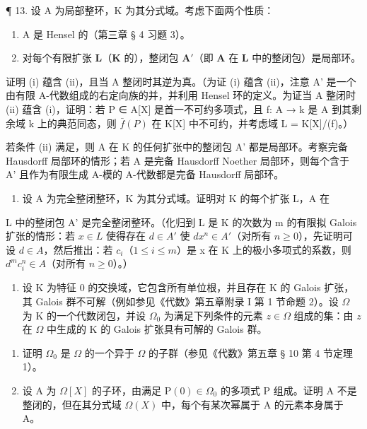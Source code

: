 ¶ 13. 设 A 为局部整环，K 为其分式域。考虑下面两个性质：

\begin{enumerate}
\def\labelenumi{(\roman{enumi})}
\item
  A 是 Hensel 的（第三章 § 4 习题 3）。
\item
  对每个有限扩张 \(\mathbf{L}\)（\(\mathbf{K}\) 的），整闭包 \(\mathbf{A}'\)（即 \(\mathbf{A}\) 在 \(\mathbf{L}\) 中的整闭包）是局部环。
\end{enumerate}

证明 (i) 蕴含 (ii)，且当 A 整闭时其逆为真。（为证 (i) 蕴含 (ii)，注意 A' 是一个由有限 A-代数组成的右定向族的并，并利用 Hensel 环的定义。为证当 A 整闭时 (ii) 蕴含 (i)，证明：若 P ∈ A{[}X{]} 是首一不可约多项式，且 f: A → k 是 A 到其剩余域 k 上的典范同态，则 \(\bar{f}(P)\) 在 K{[}X{]} 中不可约，并考虑域 L = K{[}X{]}/(f)。）

若条件 (ii) 满足，则 A 在 K 的任何扩张中的整闭包 A' 都是局部环。考察完备 Hausdorff 局部环的情形；若 A 是完备 Hausdorff Noether 局部环，则每个含于 A' 且作为有限生成 A-模的 A-代数都是完备 Hausdorff 局部环。

\begin{enumerate}
\def\labelenumi{\arabic{enumi}.}
\setcounter{enumi}{13}
\tightlist
\item
  设 A 为完全整闭整环，K 为其分式域。证明对 K 的每个扩张 L，A 在
\end{enumerate}

L 中的整闭包 A' 是完全整闭整环。（化归到 L 是 K 的次数为 m 的有限拟 Galois 扩张的情形：若 \(x \in L\) 使得存在 \(d \in A'\) 使 \(dx^{n} \in A'\)（对所有 \(n \geqslant 0\)），先证明可设 \(d \in A\)，然后推出：若 \(c_{i}\)（\(1 \leqslant i \leqslant m\)）是 x 在 K 上的极小多项式的系数，则 \(d^{m}c_{i}^{n} \in A\)（对所有 \(n \geqslant 0\)）。）

\begin{enumerate}
\def\labelenumi{\arabic{enumi}.}
\setcounter{enumi}{14}
\tightlist
\item
  设 K 为特征 0 的交换域，它包含所有单位根，并且存在 K 的 Galois 扩张，其 Galois 群不可解（例如参见《代数》第五章附录 I 第 1 节命题 2）。设 \(\Omega\) 为 K 的一个代数闭包，并设 \(\Omega_0\) 为满足下列条件的元素 \(z \in \Omega\) 组成的集：由 \(z\) 在 \(\Omega\) 中生成的 K 的 Galois 扩张具有可解的 Galois 群。
\end{enumerate}

\begin{enumerate}
\def\labelenumi{(\alph{enumi})}
\item
  证明 \(\Omega_0\) 是 \(\Omega\) 的一个异于 \(\Omega\) 的子群（参见《代数》第五章 § 10 第 4 节定理 1）。
\item
  设 A 为 \(\Omega[X]\) 的子环，由满足 \(\mathrm{P}(0) \in \Omega_{0}\) 的多项式 P 组成。证明 A 不是整闭的，但在其分式域 \(\Omega(X)\) 中，每个有某次幂属于 A 的元素本身属于 A。
\end{enumerate}

